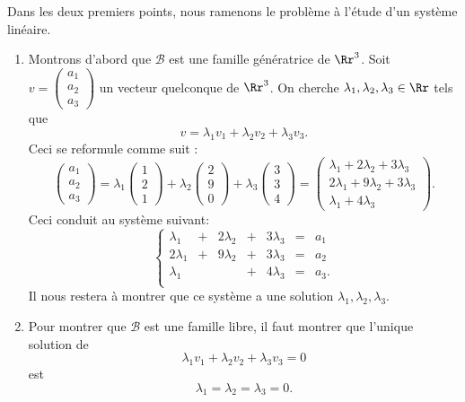 \documentclass[class=report,crop=false]{standalone}
\begin{document}
\begin{exemple}
  Dans les deux premiers points, nous ramenons le problème à l'étude d'un système linéaire.
  \begin{enumerate}
    \item   Montrons d'abord que $\mathcal{B}$ est une famille génératrice de $\Rr^3$.
    Soit $v = \left(\begin{smallmatrix}a_1\\ a_2\\ a_3\end{smallmatrix}\right)$ un vecteur
  quelconque de $\Rr^3$. On cherche $\lambda_1, \lambda_2, \lambda_3 \in \Rr$ tels que
  $$v = \lambda_1 v_1+ \lambda_2 v_2 + \lambda_3  v_3.$$
  Ceci se reformule comme suit :
$$
    \begin{pmatrix}a_1\\ a_2\\ a_3\end{pmatrix} = \lambda_1 \begin{pmatrix}1\\2\\1\end{pmatrix} + \lambda_2
      \begin{pmatrix}2\\9\\0\end{pmatrix} + \lambda_3 \begin{pmatrix}3\\3\\4\end{pmatrix}
      = \begin{pmatrix}\lambda_1 + 2\lambda_2 + 3\lambda_3\\ 2\lambda_1 + 9
      \lambda_2 + 3\lambda_3\\ \lambda_1 + 4\lambda_3\end{pmatrix}.
$$
  Ceci conduit au système suivant:
\begin{equation}
\left\{
\begin{array}{ccccccc}
\lambda_1 &+ &2\lambda_2 &+ &3\lambda_3 & = & a_1\\
2\lambda_1 &+ &9\lambda_2 &+ &3\lambda_3 & = & a_2\\
\lambda_1 &&& + &4\lambda_3 & = & a_3.\\
\end{array} \right.
\label{eq:syslingen}
\tag{S}
\end{equation}
Il nous restera à montrer que ce système a une solution $\lambda_1, \lambda_2, \lambda_3$.

    \item  Pour montrer que $\mathcal{B}$ est une famille libre,
    il faut montrer que l'unique solution de
$$\lambda_1 v_1 + \lambda_2v_2 + \lambda_3v_3 = 0$$ est
$$\lambda_1 = \lambda_2 = \lambda_3 = 0.$$


\end{enumerate}
\end{exemple}
\end{document}
